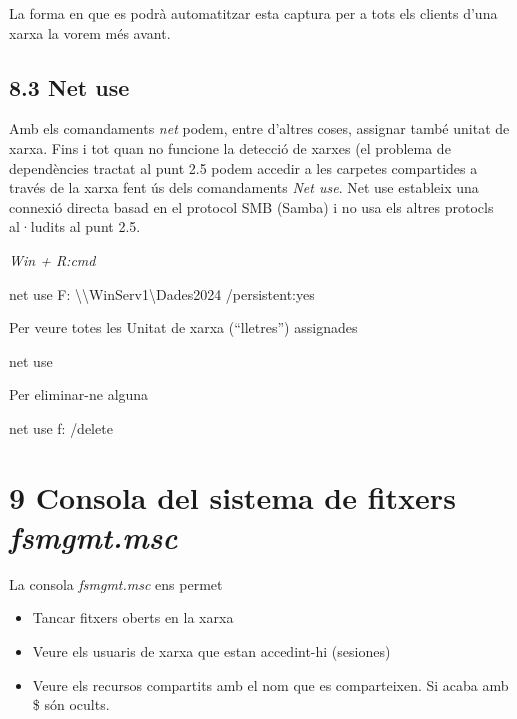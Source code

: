 \documentclass[
  a4paper,
]{article}
\newenvironment{Shaded}{\begin{snugshade}}{\end{snugshade}}
\newcommand{\AttributeTok}[1]{\textcolor[rgb]{0.13,0.29,0.53}{#1}}
\newcommand{\NormalTok}[1]{#1}
\providecommand{\tightlist}{%
  \setlength{\itemsep}{0pt}\setlength{\parskip}{0pt}}
\begin{document}
La forma en que es podrà automatitzar esta captura per a tots els
clients d'una xarxa la vorem més avant.

\subsection{8.3 Net use}\label{net-use}

Amb els comandaments \emph{net} podem, entre d'altres coses, assignar
també unitat de xarxa. Fins i tot quan no funcione la detecció de xarxes
(el problema de dependències tractat al punt 2.5 podem accedir a les
carpetes compartides a través de la xarxa fent ús dels comandaments
\emph{Net use}. Net use estableix una connexió directa basad en el
protocol SMB (Samba) i no usa els altres protocls al·ludits al punt 2.5.

\emph{Win + R:cmd}

\begin{Shaded}
\begin{Highlighting}[]
\NormalTok{net use F: \textbackslash{}\textbackslash{}WinServ1\textbackslash{}Dades2024 }\AttributeTok{/persistent:}\NormalTok{yes}
\end{Highlighting}
\end{Shaded}

Per veure totes les Unitat de xarxa (``lletres'') assignades

\begin{Shaded}
\begin{Highlighting}[]
\NormalTok{net use}
\end{Highlighting}
\end{Shaded}

Per eliminar-ne alguna

\begin{Shaded}
\begin{Highlighting}[]
\NormalTok{net use f: }\AttributeTok{/delete}
\end{Highlighting}
\end{Shaded}

\section{\texorpdfstring{9 Consola del sistema de fitxers
\emph{fsmgmt.msc}}{9 Consola del sistema de fitxers fsmgmt.msc}}\label{consola-del-sistema-de-fitxers-fsmgmt.msc}

La consola \emph{fsmgmt.msc} ens permet

\begin{itemize}
\tightlist
\item
  Tancar fitxers oberts en la xarxa
\item
  Veure els usuaris de xarxa que estan accedint-hi (sesiones)
\item
  Veure els recursos compartits amb el nom que es comparteixen. Si acaba
  amb \$ són ocults.
\end{itemize}
\end{document}
